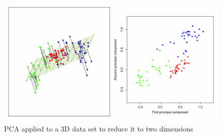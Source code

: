 \documentclass[a4paper]{article}
\begin{document}
\begin{figure}
\centering
\includegraphics[width=1.1\textwidth]{pca.png}
\caption{\label{fig:pca}PCA applied to a 3D data set to reduce it to two dimensions}
\end{figure}
\end{document}
